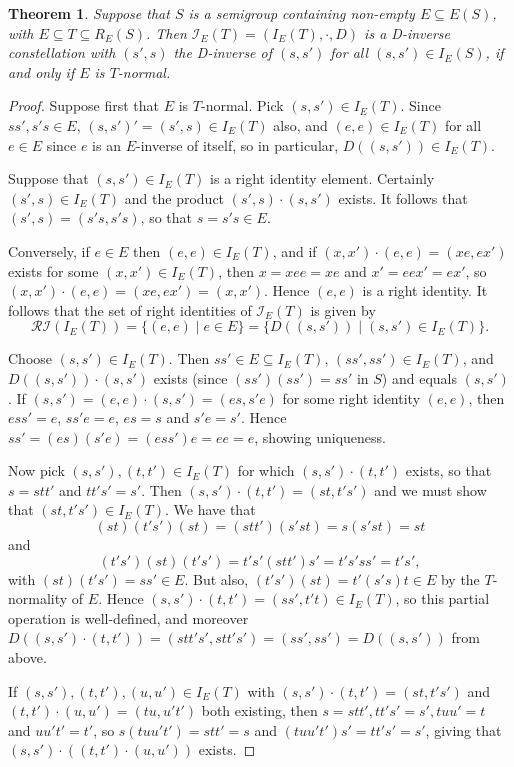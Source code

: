 \documentclass[12pt]{amsart}
\newtheorem{thm}{Theorem}[section]
\theoremstyle{definition}
\begin{document}
\begin{thm}  \label{invconsteg}
Suppose that $S$ is a semigroup containing non-empty $E\subseteq E(S)$, with $E\subseteq T\subseteq R_E(S)$. Then $\mathcal{I}_E(T)=(I_E(T),\cdot,D)$ is a D-inverse constellation with $(s',s)$ the D-inverse of $(s,s')$ for all $(s,s')\in I_E(S)$, if and only if $E$ is $T$-normal.
\end{thm}
\begin{proof}
Suppose first that $E$ is $T$-normal. Pick $(s,s')\in I_E(T)$.  Since $ss',s's\in E$, $(s,s')'=(s',s)\in I_E(T)$ also, and $(e,e)\in I_E(T)$ for all $e\in E$ since $e$ is an $E$-inverse of itself, so in particular, $D((s,s'))\in I_E(T)$. 

Suppose that $(s,s')\in I_E(T)$ is a right identity element. Certainly  
$(s',s)\in I_E(T)$ and the product $(s',s)\cdot (s,s')$ exists. It follows
that $(s',s)=(s's, s's)$, so that $s=s's\in E$.

Conversely, if $e\in E$ then $(e,e)\in I_E(T)$, and if $(x,x')\cdot (e,e)=(xe,ex')$ exists for some $(x,x')\in I_E(T)$, then $x=xee=xe$ and $x'=eex'=ex'$, so $(x,x')\cdot (e,e)=(xe,ex')=(x,x')$.  Hence $(e,e)$ is a right identity. It follows that the set of right identities of $\mathcal{I}_E(T)$ is given by
 \[\mathcal{RI}(I_E(T))=\{(e,e)\mid e\in E\}=\{D((s,s'))\mid (s,s')\in I_E(T)\}.\]

Choose $(s,s')\in I_E(T)$.  Then $ss'\in E\subseteq I_E(T)$, $(ss',ss')\in I_E(T)$, and  $D((s,s'))\cdot (s,s')$ exists (since $(ss')(ss')=ss'$ in $S$) and equals $(s,s')$.  If $(s,s')=(e,e)\cdot (s,s')=(es,s'e)$ for some right identity $(e,e)$, then $ess'=e$, $ss'e=e$, $es=s$ and $s'e=s'$. Hence $ss'=(es)(s'e)=(ess')e=ee=e$, showing uniqueness.

Now pick $(s,s'),(t,t')\in I_E(T)$ for which $(s,s')\cdot (t,t')$ exists,
so that $s=stt'$ and $tt's'=s'$.  Then $(s,s')\cdot (t,t')=(st,t's')$ and we must show that $(st,t's')\in I_E(T)$. We have that $$(st)(t's')(st)=(stt')(s'st)=s(s'st)=st$$ and $$(t's')(st)(t's')=t's'(stt')s'=t's'ss'=t's',$$ with $(st)(t's')=ss'\in E$.  But also, $(t's')(st)=t'(s's)t\in E$ by the $T$-normality of $E$.  Hence $(s,s')\cdot (t,t')=(ss',t't)\in  I_E(T)$, so this partial operation is well-defined, and moreover $D((s,s')\cdot (t,t'))=(stt's',stt's')=(ss',ss')=D((s,s'))$ from above.

If $(s,s'),(t,t'),(u,u')\in I_E(T)$ with $(s,s')\cdot (t,t')=(st,t's')$ and $(t,t')\cdot (u,u')=(tu,u't')$ both existing, then $s=stt', tt's'=s', tuu'=t$ and $ uu't'=t'$, so $s(tuu't')=stt'=s$ and $(tuu't')s'=tt's'=s'$, giving that $(s,s')\cdot ((t,t')\cdot (u,u'))$ exists.    


\end{proof}
\end{document}

